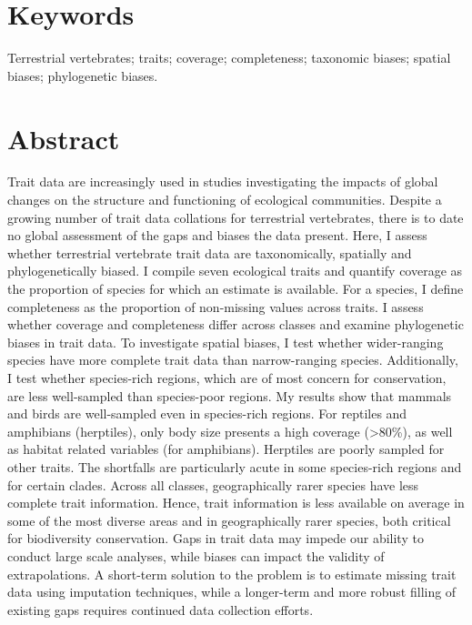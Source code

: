 \section*{Keywords}
Terrestrial vertebrates; traits; coverage; completeness; taxonomic biases; spatial biases; phylogenetic biases.

\section*{Abstract}
Trait data are increasingly used in studies investigating the impacts of global changes on the structure and functioning of ecological communities. Despite a growing number of trait data collations for terrestrial vertebrates, there is to date no global assessment of the gaps and biases the data present. Here, I assess whether terrestrial vertebrate trait data are taxonomically, spatially and phylogenetically biased. I compile seven ecological traits and quantify coverage as the proportion of species for which an estimate is available. For a species, I define completeness as the proportion of non-missing values across traits. I assess whether coverage and completeness differ across classes and examine phylogenetic biases in trait data. To investigate spatial biases, I test whether wider-ranging species have more complete trait data than narrow-ranging species. Additionally, I test whether species-rich regions, which are of most concern for conservation, are less well-sampled than species-poor regions.
My results show that mammals and birds are well-sampled even in species-rich regions. For reptiles and amphibians (herptiles), only body size presents a high coverage (>80\%), as well as habitat related variables (for amphibians). Herptiles are poorly sampled for other traits. The shortfalls are particularly acute in some species-rich regions and for certain clades. Across all classes, geographically rarer species have less complete trait information. Hence, trait information is less available on average in some of the most diverse areas and in geographically rarer species, both critical for biodiversity conservation. Gaps in trait data may impede our ability to conduct large scale analyses, while biases can impact the validity of extrapolations. A short-term solution to the problem is to estimate missing trait data using imputation techniques, while a longer-term and more robust filling of existing gaps requires continued data collection efforts.

